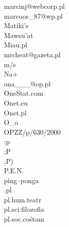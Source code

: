 \documentclass[xcolor=dvipsnames,polish]{beamer}
\begin{document}
\begin{frame}[allowframebreaks]
\begin{columns}
\begin{column}{.2\textwidth}
 marcinj@webcorp.pl\\
 marcoos\_87@wp.pl\\
 Matiki's\\
 Mawsu'at\\
 Miau.pl\\
 mrcheat@gazeta.pl\\
 m/s\\
 Na+\\
 ona\_\_\_@op.pl\\
 OneStat.com\\
 Onet.eu\\
 Onet.pl\\
 O\_o\\
 OPZZ/p/630/2000\\
 ;p\\
 ;P\\
 ;P)\\
 P.E.N.\\
 ping–ponga\\
 .pl\\
 pl.hum.teatr\\
 pl.sci.filozofia\\
 pl.soc.cośtam\\
\end{column}

\end{columns}
\end{frame}
\end{document}
